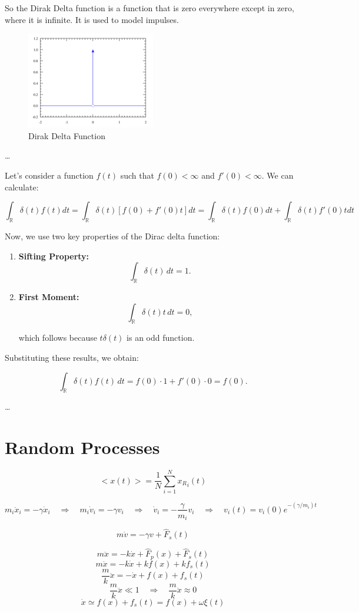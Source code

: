 So the Dirak Delta function is a function that is zero everywhere except in zero, where it is infinite. It is used to model impulses.

\begin{figure}[H]
    \centering
    \includegraphics[width=0.5\textwidth]{assets/dirak.png}
    \caption{Dirak Delta Function} \label{fig:dirak}
\end{figure}

\dots

Let's consider a function $f(t)$ such that $f(0) < \infty$ and $f'(0) < \infty$. We can calculate:

$$
\int_{\mathbb R} \delta(t) f(t) dt = \int_{\mathbb R} \delta(t) [f(0) + f'(0)t] dt = \int_{\mathbb R} \delta(t) f(0) dt + \int_{\mathbb R} \delta(t) f'(0)t dt
$$

Now, we use two key properties of the Dirac delta function:
\begin{enumerate}
    \item \textbf{Sifting Property:}
    $$
    \int_{\mathbb{R}} \delta(t) \, dt = 1.
    $$

    \item \textbf{First Moment:}
    $$
    \int_{\mathbb{R}} \delta(t)t \, dt = 0,
    $$

    which follows because \( t\delta(t) \) is an odd function.
\end{enumerate}

Substituting these results, we obtain:

$$
\int_{\mathbb{R}} \delta(t) f(t) \, dt = f(0) \cdot 1 + f'(0) \cdot 0 = f(0).
$$

\dots

\section{Random Processes}

$$
<x(t)> = \dfrac 1N \sum_{i=1}^N {x_R}_i(t)
$$

$$
m_i \ddot x_i = - \gamma \dot x_i
\quad \Rightarrow \quad
m_i \dot v_i = - \gamma v_i 
\quad \Rightarrow \quad
\dot v_i = - \dfrac{\gamma}{m_i} v_i 
\quad \Rightarrow \quad
\boxed{
v_i(t) = v_i(0) e^{-(\gamma / m_i) t}_{\phantom{-\frac 11}}
}
$$

$$
\boxed{
m \dot v = - \gamma v + \hat F_s (t) 
}
$$

$$
m \ddot x = -k\dot x + \hat F_p(x) + \hat F_s(t)
$$
$$
m \ddot x = - k \dot x + k f(x) + k f_s (t)
$$
$$
\dfrac mk \ddot x = - \dot x + f(x) + f_s(t)
$$
$$
\dfrac mk \ddot x \ll 1 \quad \Rightarrow \quad \dfrac mk \ddot x \approx 0
$$
$$
\dot x \simeq f(x) + f_s(t) = f(x) + \omega \xi (t)
$$
